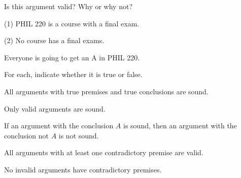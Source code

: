 \problempart
\label{pr.ImpossiblePremises}
Is this argument valid? Why or why not?
\begin{earg}
\item[(1)] PHIL 220 is a course with a final exam.
\item[(2)] No course has a final exams.
\item[\therefore] Everyone is going to get an A in PHIL 220.
\end{earg}

\problempart
\label{hw1.A}
For each, indicate whether it is true or false.
	\begin{earg}
		\item All arguments with true premises and true conclusions are sound.
		\item Only valid arguments are sound.
		\item If an argument with the conclusion $A$ is sound, then an argument with the conclusion not $A$ is not sound.
		\item All arguments with at least one contradictory premise are valid.
		\item No invalid arguments have contradictory premises.
	\end{earg}
	
	\fi 
